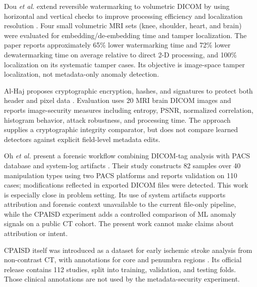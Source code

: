 \documentclass[journal]{IEEEtran}
\begin{document}
  Dou \emph{et al.} extend reversible watermarking to volumetric DICOM by using horizontal and vertical checks to improve processing efficiency and localization resolution \cite{dou2012}. Four small volumetric MRI sets (knee, shoulder, heart, and brain) were evaluated for embedding/de-embedding time and tamper localization. The paper reports approximately 65\% lower watermarking time and 72\% lower dewatermarking time on average relative to direct 2-D processing, and 100\% localization on its systematic tamper cases. Its objective is image-space tamper localization, not metadata-only anomaly detection.
  
  Al-Haj proposes cryptographic encryption, hashes, and signatures to protect both header and pixel data \cite{alhaj2015}. Evaluation uses 20 MRI brain DICOM images and reports image-security measures including entropy, PSNR, normalized correlation, histogram behavior, attack robustness, and processing time. The approach supplies a cryptographic integrity comparator, but does not compare learned detectors against explicit field-level metadata edits.
  
  Oh \emph{et al.} present a forensic workflow combining DICOM-tag analysis with PACS database and system-log artifacts \cite{oh2026}. Their study constructs 82 samples over 40 manipulation types using two PACS platforms and reports validation on 110 cases; modifications reflected in exported DICOM files were detected. This work is especially close in problem setting. Its use of system artifacts supports attribution and forensic context unavailable to the current file-only pipeline, while the CPAISD experiment adds a controlled comparison of ML anomaly signals on a public CT cohort. The present work cannot make claims about attribution or intent.
  
  CPAISD itself was introduced as a dataset for early ischemic stroke analysis from non-contrast CT, with annotations for core and penumbra regions \cite{umerenkov2025}. Its official release contains 112 studies, split into training, validation, and testing folds. Those clinical annotations are not used by the metadata-security experiment.
  
\end{document}
